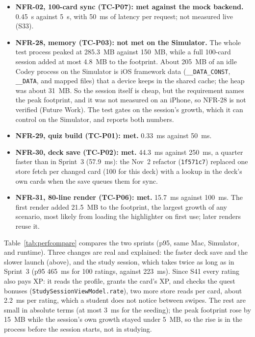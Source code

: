 \documentclass[12pt,letterpaper]{article}
\begin{document}
\begin{itemize}
        Section~\ref{sec:bottlenecks} (loader time, image counts, the \texttt{main}
        probe, the build without \texttt{-ObjC}, the one-view app, and the footprint
        breakdown) come from one-off runs whose output was not archived; the timed
        results are in the CSV files named above.
  \item \textbf{NFR-02, 100-card sync (TC-P07): met against the mock backend.} 0.45~s
        against 5~s, with 50~ms of latency per request; not measured live (S33).
  \item \textbf{NFR-28, memory (TC-P03): not met on the Simulator.} The whole test
        process peaked at 285.3~MB against 150~MB, while a full 100-card session
        added at most 4.8~MB to the footprint. About 205~MB of an idle Codey process on the
        Simulator is iOS framework data (\texttt{\_\_DATA\_CONST}, \texttt{\_\_DATA}, and
        mapped files) that a device keeps in the shared cache; the heap was about
        31~MB. So the session itself is cheap, but the requirement names the peak
        footprint, and it was not measured on an iPhone, so NFR-28 is not verified
        (Future Work). The test gates on the session's growth, which it can control on the
        Simulator, and reports both numbers.
  \item \textbf{NFR-29, quiz build (TC-P01): met.} 0.33~ms against 50~ms.
  \item \textbf{NFR-30, deck save (TC-P02): met.} 44.3~ms against 250~ms, a quarter
        faster than in Sprint~3 (57.9~ms): the Nov~2 refactor (\texttt{1f571c7}) replaced
        one store fetch per changed card (100 for this deck) with a lookup in the
        deck's own cards when the save queues them for sync.
  \item \textbf{NFR-31, 80-line render (TC-P06): met.} 15.7~ms against 100~ms. The
        first render added 21.5~MB to the footprint, the largest growth of any
        scenario, most likely from loading the highlighter on first use; later renders
        reuse it.
\end{itemize}

Table~\ref{tab:perfcompare} compares the two sprints (p95, same Mac, Simulator, and
runtime). Three changes are real and explained: the faster deck save and the slower
launch (above), and the study session, which takes twice as long as in Sprint~3 (p95
465~ms for 100 ratings, against 223~ms). Since S41 every rating also pays XP: it reads
the profile, grants the card's XP, and checks the quest bonuses
(\texttt{StudySessionViewModel.rate}), two more store reads per card, about 2.2~ms per
rating, which a student does not notice between swipes. The rest are small in
absolute terms (at most 3~ms for the seeding); the peak footprint rose by 15~MB while
the session's own growth stayed under 5~MB, so the rise is in the process before the
session starts, not in studying.
\end{document}

